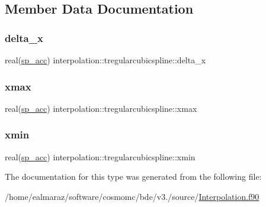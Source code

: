 \subsection{Member Data Documentation}
\mbox{\label{structinterpolation_1_1tregularcubicspline_a18ac6106071edf542e4d6d27716c3eb0}} 
\subsubsection{\texorpdfstring{delta\+\_\+x}{delta\_x}}
{\footnotesize\ttfamily real(\mbox{\hyperlink{namespaceinterpolation_af72aa9a05feb8ef90b2d26e4a013abf3}{sp\+\_\+acc}}) interpolation\+::tregularcubicspline\+::delta\+\_\+x}

\mbox{\label{structinterpolation_1_1tregularcubicspline_a7d69fe51d1195467af6ccd10d0526cd5}} 
\subsubsection{\texorpdfstring{xmax}{xmax}}
{\footnotesize\ttfamily real(\mbox{\hyperlink{namespaceinterpolation_af72aa9a05feb8ef90b2d26e4a013abf3}{sp\+\_\+acc}}) interpolation\+::tregularcubicspline\+::xmax}

\mbox{\label{structinterpolation_1_1tregularcubicspline_ae119fa974d0affa5f8bcdcc19bd8c3a7}} 
\subsubsection{\texorpdfstring{xmin}{xmin}}
{\footnotesize\ttfamily real(\mbox{\hyperlink{namespaceinterpolation_af72aa9a05feb8ef90b2d26e4a013abf3}{sp\+\_\+acc}}) interpolation\+::tregularcubicspline\+::xmin}



The documentation for this type was generated from the following file\+:\begin{DoxyCompactItemize}
\item 
/home/ealmaraz/software/cosmomc/bde/v3./source/\mbox{\hyperlink{Interpolation_8f90}{Interpolation.\+f90}}\end{DoxyCompactItemize}
